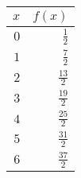 \begin{tabular}{rr} \toprule
$x$  & $f(x)$         \\\midrule
$0$  & $\frac{1}{2}$  \\[6pt]
$1$  & $\frac{7}{2}$  \\[6pt]
$2$  & $\frac{13}{2}$ \\[6pt]
$3$  & $\frac{19}{2}$ \\[6pt]
$4$  & $\frac{25}{2}$ \\[6pt]
$5$  & $\frac{31}{2}$ \\[6pt]
$6$  & $\frac{37}{2}$ \\\bottomrule
\end{tabular}
